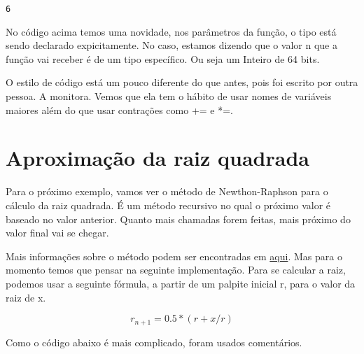 \documentclass[
  letterpaper,
  DIV=11,
  numbers=noendperiod]{scrreprt}
\begin{document}
\begin{verbatim}
6
\end{verbatim}

No código acima temos uma novidade, nos parâmetros da função, o tipo
está sendo declarado expicitamente. No caso, estamos dizendo que o valor
n que a função vai receber é de um tipo específico. Ou seja um Inteiro
de 64 bits.

O estilo de código está um pouco diferente do que antes, pois foi
escrito por outra pessoa. A monitora. Vemos que ela tem o hábito de usar
nomes de variáveis maiores além do que usar contrações como += e *=.

\section{Aproximação da raiz
quadrada}\label{aproximauxe7uxe3o-da-raiz-quadrada}

Para o próximo exemplo, vamos ver o método de Newthon-Raphson para o
cálculo da raiz quadrada. É um método recursivo no qual o próximo valor
é baseado no valor anterior. Quanto mais chamadas forem feitas, mais
próximo do valor final vai se chegar.

Mais informações sobre o método podem ser encontradas em
\href{https://pt.wikipedia.org/wiki/M\%C3\%A9todo_de_Newton\%E2\%80\%93Raphson}{aqui}.
Mas para o momento temos que pensar na seguinte implementação. Para se
calcular a raiz, podemos usar a seguinte fórmula, a partir de um palpite
inicial r, para o valor da raiz de x.

\[ r_{n+1} = 0.5 * (r + x / r)\]

Como o código abaixo é mais complicado, foram usados comentários.
\end{document}
